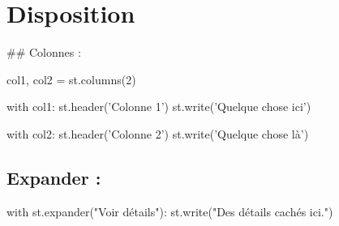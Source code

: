  \section*{Disposition}

\#\# Colonnes \+: 
\begin{DoxyCode}
col1, col2 = st.columns(2)

with col1:
    st.header('Colonne 1')
    st.write('Quelque chose ici')

with col2:
    st.header('Colonne 2')
    st.write('Quelque chose là')
\end{DoxyCode}
 \subsection*{Expander \+:}


\begin{DoxyCode}
with st.expander("Voir détails"):
    st.write("Des détails cachés ici.")
\end{DoxyCode}
 